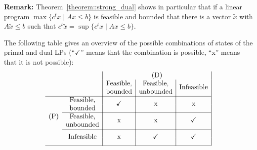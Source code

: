 \documentclass[12pt, showidx, twoside]{article}
\def\endproof{\hfill{$\Box$}}
\newcommand{\up}{\raisebox{1.5ex}[-1.5ex]}
\begin{document}
{{{{%





{\bf Remark:} Theorem~\ref{theorem::strong_dual} shows in particular that if 
a linear program $\max\{c^t x \mid Ax\leq b\}$ is feasible and bounded
that there is a vector $\tilde x$ with $A\tilde x\leq b$ such that 
$c^t \tilde x = \sup\{c^t x \mid Ax\leq b\}$.







The following table gives an overview of the possible combinations
of states of the primal and dual LPs (``$\checkmark$'' means that the
combination is possible, ``x'' means that it is not possible):
\[
\begin{array}{cc|c|c|c|}
    &                     &   \multicolumn{3}{c|}{\mbox{(D)}}\\
    &                     & \mbox{Feasible,} 
                                & \mbox{Feasible,} 
                                      & \mbox{}\\
    &                     & \mbox{bounded} 
                                & \mbox{unbounded} 
                                      & \up{\mbox{Infeasible}}\\ \cline{1-5}
    & \mbox{Feasible,}   
                          &     &     &  \\
    & \mbox{bounded}   
                          & \up{\checkmark} & \up{x} & \up{x} \\ \cline{2-5}
\mbox{(P)}
    & \mbox{Feasible,}
                          &        &        &        \\
    & \mbox{unbounded}
                          & \up{x} & \up{x} & \up{\checkmark} \\ \cline{2-5}
    &                     &        &        &  \\
    & \up{\mbox{Infeasible}}
                          & \up{x} & \up{\checkmark} & \up{\checkmark} \\ \cline{1-5}
\end{array}
\]


}}}}
\end{document}
